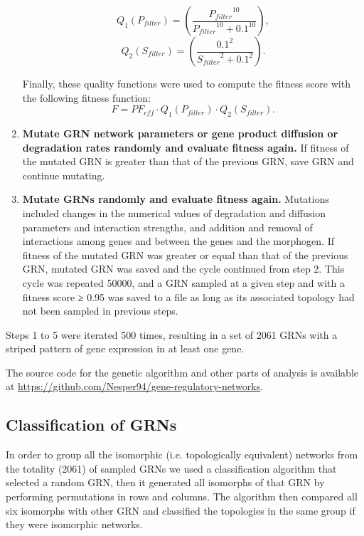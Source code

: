 \documentclass[10pt,letterpaper]{article}
\begin{document}
\begin{enumerate}
 \begin{equation}
  Q_1(P_{filter}) = \left( \frac{ {P_{filter}}^{10} }{ {P_{filter}}^{10} +
  0.1^{10} } \right),
 \end{equation}
 \begin{equation}
  Q_2(S_{filter}) = \left( \frac{ 0.1^2 }{ {S_{filter}}^2 + 0.1^2 } \right).
 \end{equation}

 Finally, these quality functions were used to compute the fitness score with
 the following fitness function:
 \begin{equation}
  F = \mathit{PF_{eff}} \cdot Q_1(P_{filter}) \cdot Q_2(S_{filter}).
 \end{equation}

 \item{\bf Mutate GRN network parameters or gene product diffusion or
degradation rates randomly and evaluate fitness again.} If fitness of the
mutated GRN is greater than that of the previous GRN, save GRN and continue
mutating.

 \item {\bf Mutate GRNs randomly and evaluate fitness again.} Mutations
included changes in the  numerical values of degradation and diffusion
parameters and interaction strengths, and addition and removal of interactions
among genes and between the genes and the morphogen. If fitness of the mutated
GRN was greater or equal than that of the previous GRN, mutated GRN was saved
and the cycle continued from step 2. This cycle was repeated 50000, and a GRN
sampled at a given step and with a fitness score ≥ 0.95 was saved to a file as
long as its associated topology had not been sampled in previous steps.

\end{enumerate}

Steps 1 to 5 were iterated 500 times, resulting in a set of 2061 GRNs with a
striped pattern of gene expression in at least one gene.

The source code for the genetic algorithm and other parts of analysis is available at
\url{https://github.com/Nesper94/gene-regulatory-networks}.

\subsection*{Classification of GRNs}

In order to group all the isomorphic (i.e. topologically equivalent) networks from
the totality (2061) of sampled GRNs we used a
classification algorithm that selected a random GRN, then it generated all
isomorphs of that GRN by performing permutations in rows and columns. The
algorithm then compared all six isomorphs with other GRN and classified the
topologies in the same group if they were isomorphic networks.
\end{document}
